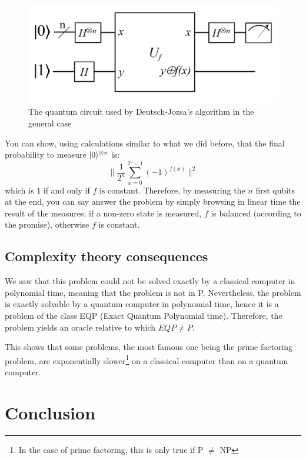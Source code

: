 \documentclass[12pt,a4paper]{article}
\theoremstyle{plain}
\theoremstyle{definition}
\DeclarePairedDelimiter\ket{\lvert}{\rangle}
\begin{document}
\begin{figure}[!h]
    \centering
    \includegraphics*[scale=0.4]{deutsch-circuit-n.png}
    \caption{The quantum circuit used by Deutsch-Jozsa's algorithm in the general case}
\end{figure}

You can show, using calculations similar to what we did before, that the final probability to measure $\ket{0}^{\otimes n}$ is:
\begin{equation*}
    \|\frac{1}{2^n}\sum_{x=0}^{2^n-1}(-1)^{f(x)}\|^2
\end{equation*}
which is $1$ if and only if $f$ is constant.
Therefore, by measuring the $n$ first qubits at the end, you can say answer the problem by simply browsing in linear time the result of the measures; if a non-zero state is measured, $f$ is balanced (according to the promise), otherwise $f$ is constant.


\subsection{Complexity theory consequences}
We saw that this problem could not be solved exactly by a classical computer in polynomial time, meaning that the problem is not in P. Nevertheless, the problem is exactly solvable by a quantum computer in polynomial time, hence it is a problem of the class EQP (Exact Quantum Polynomial time). Therefore, the problem yields an oracle relative to which $EQP \neq P$.

This shows that some problems, the most famous one being the prime factoring problem, are exponentially slower\footnote{In the case of prime factoring, this is only true if P $\neq$ NP} on a classical computer than on a quantum computer.

\section*{Conclusion}

\nocite{*}
\printbibliography
\end{document}
